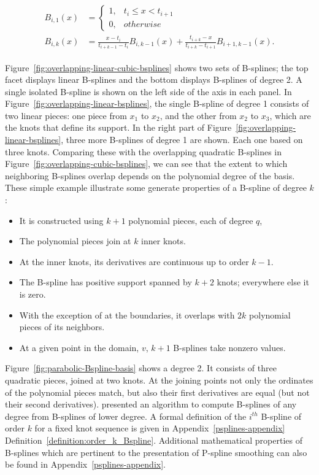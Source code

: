 \begin{align} 
\begin{split} \label{eq:bspline-recursive-relation}
B_{i,1}\left(x\right) &= \left\{ \begin{array}{ll}
1, & t_i \le x < t_{i+1}\\
0, & otherwise
\end{array} \right.
\\
B_{i,k}\left(x\right) &= \frac{x-t_i}{t_{i+k-1}-t_i}B_{i,k-1}\left(x\right) + \frac{t_{i+k}-x}{t_{i+k}-t_{i+1}}B_{i+1,k-1}\left(x\right). 
\end{split}
\end{align}

Figure~\ref{fig:overlapping-linear-cubic-bsplines} shows two sets of B-splines; the top facet displays linear B-splines and the bottom displays B-splines of degree 2. A single isolated B-spline is shown on the left side of the axis in each panel. In Figure~\ref{fig:overlapping-linear-bsplines}, the single B-spline of degree 1 consists of two linear pieces: one piece from $x_1$ to $x_2$, and the other from $x_2$ to $x_3$, which are the knots that define its support. In the right part of Figure~\ref{fig:overlapping-linear-bsplines}, three more B-splines of degree 1 are shown. Each one based on three knots. Comparing these with the overlapping quadratic B-splines in Figure~\ref{fig:overlapping-cubic-bsplines}, we can see that the extent to which neighboring B-splines overlap depends on the polynomial degree of the basis. These simple example illustrate some generate properties of a B-spline of degree $k$:

\begin{itemize}
\item It is constructed using $k + 1$ polynomial pieces, each of degree $q$,
\item The polynomial pieces join at $k$ inner knots.
\item At the inner knots, its derivatives are continuous up to order $k-1$.
\item The B-spline has positive support spanned by $k + 2$ knots; everywhere else it is zero.
\item With the exception of at the boundaries, it overlaps with $2k$ polynomial pieces of its neighbors.
\item At a given point in the domain, $v$, $k + 1$ B-splines take nonzero values.
\end{itemize}

Figure~\ref{fig:parabolic-Bspline-basis} shows a degree 2. It consists of three quadratic pieces, joined at two knots. At the joining points not only the ordinates of the polynomial pieces match, but also their first derivatives are equal (but not their second derivatives).  \cite{de1978practical} presented an algorithm to compute B-splines of any degree from B-splines of lower degree.  A formal definition of the $i^{th}$ B-spline of order $k$ for a fixed knot sequence is given in Appendix~\ref{psplines-appendix} Definition~\ref{definition:order_k_Bspline}. Additional mathematical properties of B-splines which are pertinent to the presentation of P-spline smoothing can also be found in Appendix~\ref{psplines-appendix}.

